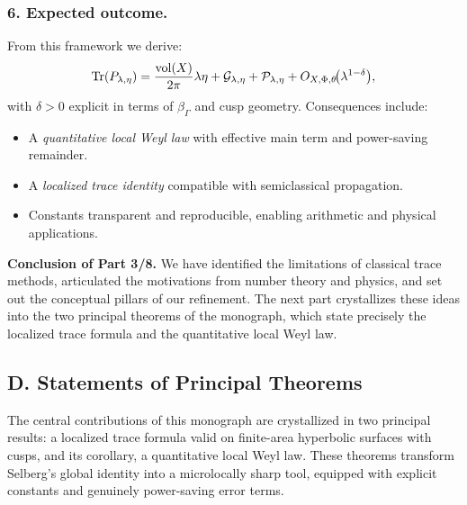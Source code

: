 \subsubsection*{6. Expected outcome.}
From this framework we derive:
\[
  \operatorname{Tr}(P_{\lambda,\eta})
  = \frac{\operatorname{vol}(X)}{2\pi}\lambda\eta
    + \mathcal{G}_{\lambda,\eta}
    + \mathcal{P}_{\lambda,\eta}
    + O_{X,\Phi,\theta}\!\big(\lambda^{1-\delta}\big),
\]
with $\delta>0$ explicit in terms of $\beta_\Gamma$ and cusp geometry.
Consequences include:
\begin{itemize}
  \item A \emph{quantitative local Weyl law} with effective main term and power-saving remainder.
  \item A \emph{localized trace identity} compatible with semiclassical propagation.
  \item Constants transparent and reproducible, enabling arithmetic and physical applications.
\end{itemize}

\medskip

\noindent\textbf{Conclusion of Part 3/8.}
We have identified the limitations of classical trace methods, articulated the
motivations from number theory and physics, and set out the conceptual pillars
of our refinement. The next part crystallizes these ideas into the two principal
theorems of the monograph, which state precisely the localized trace formula
and the quantitative local Weyl law.


\subsection*{D. Statements of Principal Theorems}
\label{sub:intro-mainthms}

The central contributions of this monograph are crystallized in two principal results:
a localized trace formula valid on finite-area hyperbolic surfaces with cusps,
and its corollary, a quantitative local Weyl law.
These theorems transform Selberg’s global identity into a microlocally sharp tool,
equipped with explicit constants and genuinely power-saving error terms.

